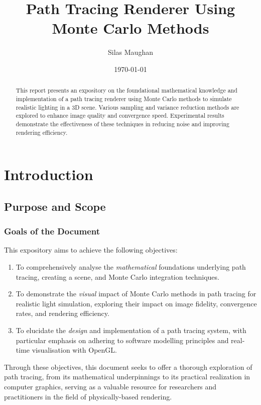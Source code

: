 \documentclass[12pt]{article}
\title{Path Tracing Renderer Using Monte Carlo Methods}
\author{Silas Maughan}
\date{\today}
\begin{document}
\maketitle
\begin{abstract}
    This report presents an expository on the foundational mathematical knowledge and implementation of a path tracing renderer using Monte Carlo methods to simulate realistic lighting in a 3D scene. Various sampling and variance reduction methods are explored to enhance image quality and convergence speed. Experimental results demonstrate the effectiveness of these techniques in reducing noise and improving rendering efficiency.
\end{abstract}

\tableofcontents
\break
\section{Introduction}
\label{sec:intro}
\subsection{Purpose and Scope}
\subsubsection{Goals of the Document}

This expository aims to achieve the following objectives:
\begin{enumerate}
    \item To comprehensively analyse the \textit{mathematical} foundations underlying path tracing, creating a scene, and Monte Carlo integration techniques.

    \item To demonstrate the \textit{visual} impact of Monte Carlo methods in path tracing for realistic light simulation, exploring their impact on image fidelity, convergence rates, and rendering efficiency.

    \item To elucidate the \textit{design} and implementation of a path tracing system, with particular emphasis on adhering to software modelling principles and real-time visualisation with OpenGL.
\end{enumerate}

Through these objectives, this document seeks to offer a thorough exploration of path tracing, from its mathematical underpinnings to its practical realization in computer graphics, serving as a valuable resource for researchers and practitioners in the field of physically-based rendering.
\end{document}
